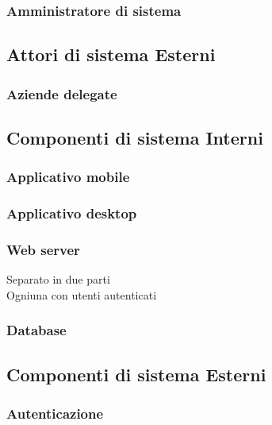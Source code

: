 \documentclass{article}
\begin{document}
\subsubsection{Amministratore di sistema}

\subsection{Attori di sistema Esterni}

\subsubsection{Aziende delegate}

\subsection{Componenti di sistema Interni}
\subsubsection{Applicativo mobile}

\subsubsection{Applicativo desktop}

\subsubsection{Web server}

Separato in due parti\\
Ogniuna con utenti autenticati

\subsubsection{Database}

\subsection{Componenti di sistema Esterni}

\subsubsection{Autenticazione}
\end{document}
